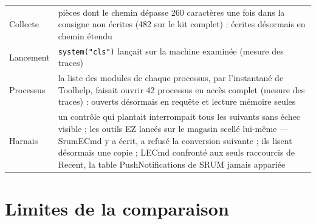 \documentclass[11pt,a4paper,oneside]{report}
\begin{document}
\begin{longtable}{@{}L{3.0cm}L{12.0cm}@{}}
Collecte & pièces dont le chemin dépasse 260 caractères une fois dans la consigne non écrites (482 sur le kit complet) : écrites désormais en chemin étendu \\
Lancement & \texttt{system("cls")} lançait  sur la machine examinée (mesure des traces) \\
Processus & la liste des modules de chaque processus, par l'instantané de Toolhelp, faisait ouvrir 42 processus en accès complet (mesure des traces) : ouverts désormais en requête et lecture mémoire seules \\
Harnais & un contrôle qui plantait interrompait tous les suivants sans échec visible ; les outils EZ lancés sur le magasin scellé lui-même --- SrumECmd y a écrit, \wac{} a refusé la conversion suivante ; ils lisent désormais une copie ; LECmd confronté aux seuls raccourcis de Recent, la table PushNotifications de SRUM jamais appariée \\
\bottomrule
\end{longtable}

\chapter{Limites de la comparaison}\label{chap:limites}
\end{document}
